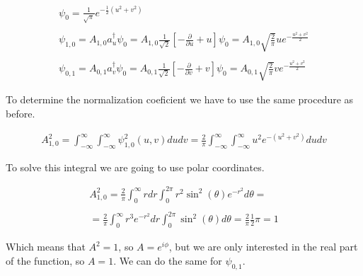 \begin{equation}
  \begin{array}{c}
    \psi_0 = \frac{1}{\sqrt{\pi}} e^{-\frac{1}{2}(u^2+v^2)}
    \\

    \\
    \psi_{1,0} = A_{1,0} a_u^{\dagger} \psi_0 = A_{1,0} \frac{1}{\sqrt{2}}\left[-\frac{\partial}{\partial u}+u\right]\psi_0 = A_{1,0} \sqrt{\frac{2}{\pi}} u e^{-\frac{u^2+v^2}{2}}
    \\

    \\
    \psi_{0,1} = A_{0,1} a_v^{\dagger} \psi_0 = A_{0,1} \frac{1}{\sqrt{2}}\left[-\frac{\partial}{\partial v}+v\right]\psi_0 = A_{0,1} \sqrt{\frac{2}{\pi}} v e^{-\frac{u^2+v^2}{2}}
  \end{array}
\end{equation}

To determine the normalization coeficient we have to use the same procedure as before.

\begin{equation}
  \begin{array}{c}
    A^2_{1,0} = \int_{-\infty}^{\infty}\int_{-\infty}^{\infty} \psi_{1,0}^2(u,v) du dv = \frac{2}{\pi} \int_{-\infty}^{\infty}\int_{-\infty}^{\infty} u^2 e^{-(u^2+v^2)} du dv
  \end{array}
\end{equation}

To solve this integral we are going to use polar coordinates.

\begin{equation}
  \begin{array}{c}
    A^2_{1,0} = \frac{2}{\pi} \int_{0}^{\infty} rdr \int_{0}^{2\pi} r^2 \sin^2(\theta) e^{-r^2} d\theta =
    \\

    \\
    = \frac{2}{\pi} \int_{0}^{\infty} r^3 e^{-r^2} dr \int_{0}^{2\pi} \sin^2(\theta) d\theta = \frac{2}{\pi} \frac{1}{2} \pi = 1
  \end{array}
\end{equation}

Which means that $A^2 = 1$, so $A = e^{i\phi}$, but we are only interested in the real part of the function, so $A = 1$. We can do the same for $\psi_{0,1}$.


